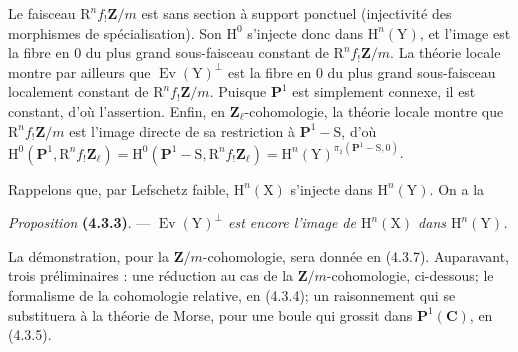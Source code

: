 \documentclass[11pt,leqno]{article}
\begin{document}
Le faisceau \(\mathrm{R}^n f_!\mathbf{Z}/m\) est sans section à support ponctuel (injectivité des morphismes de spécialisation). Son \(\mathrm{H}^0\) s’injecte donc dans \(\mathrm{H}^n(\mathrm{Y})\), et l’image est la fibre en \(0\) du plus grand sous-faisceau constant de \(\mathrm{R}^n f_!\mathbf{Z}/m\). La théorie locale montre par ailleurs que \(\operatorname{Ev}(\mathrm{Y})^\perp\) est la fibre en \(0\) du plus grand sous-faisceau localement constant de \(\mathrm{R}^n f_!\mathbf{Z}/m\). Puisque \(\mathbf{P}^1\) est simplement connexe, il est constant, d’où l’assertion. Enfin, en \(\mathbf{Z}_\ell\)-cohomologie, la théorie locale montre que \(\mathrm{R}^n f_!\mathbf{Z}/m\) est l’image directe de sa restriction à \(\mathbf{P}^1-\mathrm{S}\), d’où \(\mathrm{H}^0(\mathbf{P}^1,\mathrm{R}^n f_!\mathbf{Z}_\ell)=\mathrm{H}^0(\mathbf{P}^1-\mathrm{S},\mathrm{R}^n f_!\mathbf{Z}_\ell)=\mathrm{H}^n(\mathrm{Y})^{\pi_1(\mathbf{P}^1-\mathrm{S},0)}\).

Rappelons que, par Lefschetz faible, \(\mathrm{H}^n(\mathrm{X})\) s’injecte dans \(\mathrm{H}^n(\mathrm{Y})\). On a la

\textit{Proposition} \textbf{(4.3.3)}. — \textit{\(\operatorname{Ev}(\mathrm{Y})^\perp\) est encore l’image de \(\mathrm{H}^n(\mathrm{X})\) dans \(\mathrm{H}^n(\mathrm{Y})\).}

La démonstration, pour la \(\mathbf{Z}/m\)-cohomologie, sera donnée en (4.3.7). Auparavant, trois préliminaires : une réduction au cas de la \(\mathbf{Z}/m\)-cohomologie, ci-dessous; le formalisme de la cohomologie relative, en (4.3.4); un raisonnement qui se substituera à la théorie de Morse, pour une boule qui grossit dans \(\mathbf{P}^1(\mathbf{C})\), en (4.3.5).
\end{document}
